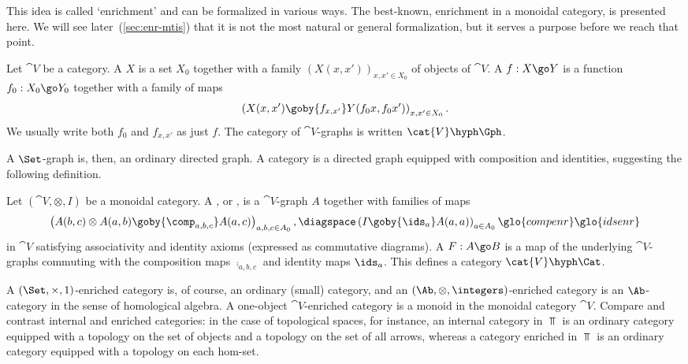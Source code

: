 This idea is called `enrichment' and can be formalized in various ways.
The best-known, enrichment in a monoidal category, is presented here.  We
will see later~(\ref{sec:enr-mtis}) that it is not the most natural or
general formalization, but it serves a purpose before we reach that point.

\begin{defn}	
Let $\cat{V}$ be a category.  A %
%
%
$X$ is a set $X_0$
together with a family $(X(x,x'))_{x,x' \in X_0}$ of objects of $\cat{V}$.
A  $f: X \go Y$ is a function $f_0: X_0 \go
Y_0$ together with a family of maps
\[
\left( X(x, x') \goby{f_{x, x'}} Y(f_0 x, f_0 x') \right)_{x, x' \in X_0}.
\]
We usually write both $f_0$ and $f_{x, x'}$ as just $f$.  The category of
$\cat{V}$-graphs is written $\cat{V}\hyph\Gph$.%
% 
%
\end{defn}
% 
A $\Set$-graph is, then, an ordinary directed graph.  A category is a
 directed graph equipped with composition and identities, suggesting the
 following definition.
% 
\begin{defn}	
Let $(\cat{V}, \otimes, I)$ be a monoidal category.  A ,%
%
%
or , is a
$\cat{V}$-graph $A$ together with families of maps
\[
\left(
A(b, c) \otimes A(a, b) \goby{\comp_{a,b,c}} A(a,c)
\right)_{a, b, c \in A_0},
\diagspace
\left(
I \goby{\ids_a} A(a,a)
\right)_{a \in A_0}%
% 
\glo{compenr}\glo{idsenr}
%
\]
in $\cat{V}$ satisfying associativity and identity axioms (expressed as
commutative diagrams).  A  $F: A \go B$ is
a map of the underlying $\cat{V}$-graphs commuting with the composition
maps $\comp_{a,b,c}$ and identity maps $\ids_a$.  This defines a category
$\cat{V}\hyph\Cat$.%
% 
%
\end{defn}
% 
A $(\Set, \times, 1)$-enriched category is, of course, an ordinary (small)
category, and an $(\Ab, \otimes, \integers)$-enriched category is an
$\Ab$-category%
%
%
in the sense of homological algebra.  A one-object
$\cat{V}$-enriched category is a monoid%
%
%
in the monoidal category $\cat{V}$.
Compare and contrast internal%
%
%
%
%
and enriched categories: in the case of
topological spaces, for instance, an internal category in $\Top$ is an
ordinary category equipped with a topology on the set of objects and a
topology on the set of all arrows, whereas a category enriched in $\Top$ is
an ordinary category equipped with a topology on each hom-set.

